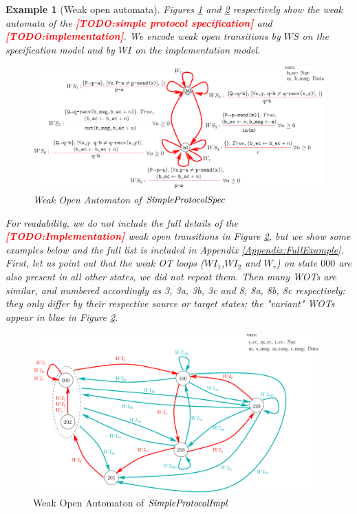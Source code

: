 \documentclass{lmcs}
\newcommand{\TODO}[1]{\textcolor{red}{\textbf{[TODO:#1]}}}
\newtheorem{example}{Example}
\begin{document}
  \begin{example}[Weak open automata]
    Figures \ref{SimpleProtCounter:WeakSpecOA} and \ref{SimpleProtCounter:ImplWOA2} respectively show the weak automata of the \TODO{simple protocol specification} and \TODO{implementation}. We encode weak open transitions  by $WS$ on the specification model and by $WI$ on the implementation model.
    



\begin{figure}[h]
   \centerline{\includegraphics[width=15cm]{XFIG/SPSpecWeakOpen}}
  \caption{Weak Open Automaton of  $\symb{SimpleProtocolSpec}$}
   \label{SimpleProtCounter:WeakSpecOA}
\end{figure}

 For readability, we do not include the full details of the \TODO{Implementation} weak open transitions in Figure \ref{SimpleProtCounter:ImplWOA2}, but we show some examples below and the full list is included in Appendix \ref{Appendix:FullExample}.
First, let us point out that the weak OT loops ($WI_1$,$WI_2$ and $W_\tau$) on state ${000}$ are also present in all other states, we did not repeat them. Then many WOTs are similar, and numbered accordingly as 3, 3a, 3b, 3c and 8, 8a, 8b, 8c respectively: they only differ by their respective source or target states; the "variant" WOTs appear in blue in   Figure \ref{SimpleProtCounter:ImplWOA2}.
\end{example}




\begin{figure}[h]
   \centerline{\includegraphics[width=11cm]{XFIG/SimpleProtImpl-WOA2}}
  \caption{Weak Open Automaton of $\symb{SimpleProtocolImpl}$}
   \label{SimpleProtCounter:ImplWOA2}
\end{figure}
\end{document}
